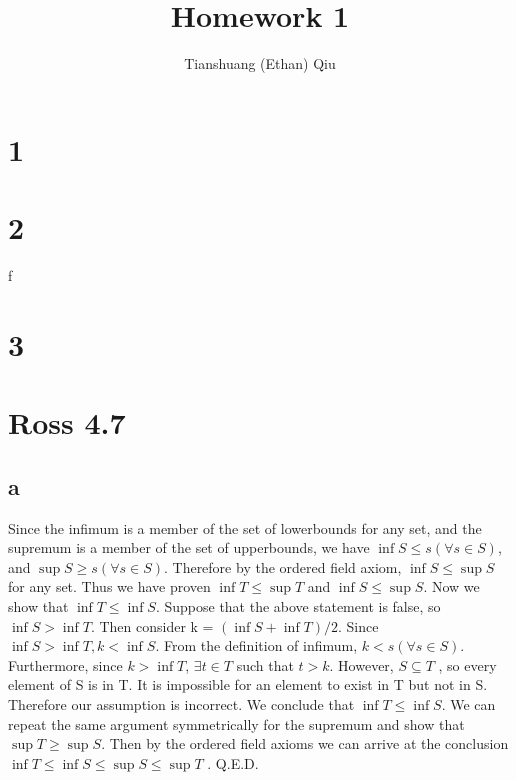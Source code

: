 \documentclass[12pt]{article}
\author{Tianshuang (Ethan) Qiu}
\begin{document}
\title{Homework 1}
\newcommand{\Z}{\mathbb{Z}}
\newcommand{\N}{\mathbb{N}}
\newcommand{\R}{\mathbb{R}}
\newcommand{\Q}{\mathbb{Q}}
\newcommand{\prob}{\mathbb{P}}

\maketitle
\newpage

\section{1}
\newpage
\section{2}
\newpage
f
\newpage

\section{3}
\newpage
\section{Ross 4.7}

\subsection{a}

Since the infimum is a member of the set of lowerbounds for any set, and the
supremum is a member of the set of upperbounds, we have $\inf S \leq  s(\forall s \in S)$,
and $\sup S \geq s(\forall s \in S)$. Therefore by the ordered field axiom, $\inf S \leq \sup S$
for any set.
\newline
Thus we have proven $\inf T \leq \sup T$ and $\inf S \leq \sup S$. Now we show that
$\inf T \leq \inf S$.
\newline
Suppose that the above statement is false, so $\inf S > \inf T $. Then consider k =
$(\inf S + \inf T) /2$. Since $\inf S > \inf T , k < \inf S$. From the definition of
infimum, $k < s(\forall s \in S)$. Furthermore, since $k > \inf T $, $\exists t \in T$ such that
$t > k$. However, $S \subseteq T$ , so every element of S is in T. It is impossible for an
element to exist in T but not in S. Therefore our assumption is incorrect.
\newline
We conclude that $\inf T \leq \inf S$.
We can repeat the same argument symmetrically for the supremum and show
that $\sup T \geq \sup S$. Then by the ordered field axioms we can arrive at the
conclusion $\inf T \leq \inf S \leq \sup S \leq \sup T$ .
Q.E.D.
\end{document}
